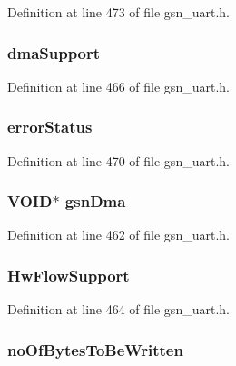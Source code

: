 Definition at line 473 of file gsn\_\-uart.h.

\hypertarget{a00263_a528c61545e39ea28f9a468044a298376}{
\subsubsection[{dmaSupport}]{ {\bf dmaSupport}}}
\label{a00263_a528c61545e39ea28f9a468044a298376}


Definition at line 466 of file gsn\_\-uart.h.

\hypertarget{a00263_aaba99cbc2d5e665d9cae1980b3a426cb}{
\subsubsection[{errorStatus}]{ {\bf errorStatus}}}
\label{a00263_aaba99cbc2d5e665d9cae1980b3a426cb}


Definition at line 470 of file gsn\_\-uart.h.

\hypertarget{a00263_a5b5e40cd759417310e7a487b029488e8}{
\subsubsection[{gsnDma}]{\setlength{\rightskip}{0pt plus 5cm}VOID$\ast$ {\bf gsnDma}}}
\label{a00263_a5b5e40cd759417310e7a487b029488e8}


Definition at line 462 of file gsn\_\-uart.h.

\hypertarget{a00263_afcdcf525c04f0b05dabb1816248b6bd9}{
\subsubsection[{HwFlowSupport}]{ {\bf HwFlowSupport}}}
\label{a00263_afcdcf525c04f0b05dabb1816248b6bd9}


Definition at line 464 of file gsn\_\-uart.h.

\hypertarget{a00263_ae09323dd91f7fb30eeaa3d7e3ec1c2a8}{
\subsubsection[{noOfBytesToBeWritten}]{ {\bf noOfBytesToBeWritten}}}
\label{a00263_ae09323dd91f7fb30eeaa3d7e3ec1c2a8}


